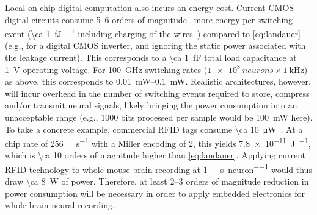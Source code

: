 Local on-chip digital computation also incurs an energy cost.
Current CMOS digital circuits consume 5--6 orders of magnitude~\cite{tucker11,koomey11,yablonovitch08,tucker11b} more energy per switching event (\SI{\ca 1}{\femto\joule\per\bit} including charging of the wires~\cite{tucker11}) compared to \ref{eq:landauer} (e.g., for a digital CMOS inverter, and ignoring the static power associated with the leakage current).
This corresponds to a \SI{\ca 1}{\femto\farad} total load capacitance at \SI{1}{\volt} operating voltage. For \SI{100}{\giga\hertz} switching rates ($\SI{1e8}{neurons} \times \SI{1}{\kilo\hertz}$) as above, this corresponds to \SIrange{0.01}{0.1}{\milli\watt}.
Realistic architectures, however, will incur overhead in the number of switching events required to store, compress and/or transmit neural signals, likely bringing the power consumption into an unacceptable range (e.g., \num{1000} bits processed per sample would be \SI{100}{\milli\watt} here).
To take a concrete example, commercial RFID tags consume \SI{\ca 10}{\micro\watt}~\cite{rfidsheet}.
At a chip rate of \SI{256}{\kilo\bit\per\second} with a Miller encoding of 2, this yields \SI{7.8e-11}{\joule\per\bit}, which is \num{\ca 10} orders of magnitude higher than \ref{eq:landauer}.
Applying current RFID technology to whole mouse brain recording at \SI{1}{\kilo\bit\per\second\per neuron} would thus draw \SI{\ca 8}{\watt} of power.
Therefore, at least 2--3 orders of magnitude reduction in power consumption will be necessary in order to apply embedded electronics for whole-brain neural recording.

